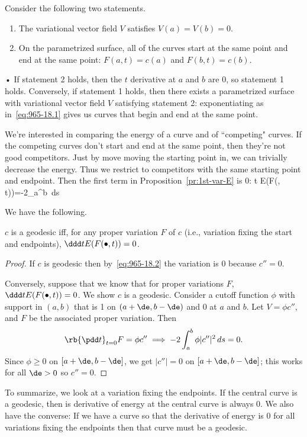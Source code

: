 Consider the following two statements.
\begin{enumerate}
\item
The variational vector field $V$ satisfies $V(a)=V(b)=0$.
\item
On the parametrized surface, all of the curves start at the same point and end at the same point: $F(a,t)=c(a)$ and $F(b,t)=c(b)$.
\end{enumerate}•
If statement 2 holds, then the $t$ derivative at $a$ and $b$ are 0, so statement 1 holds. %
Conversely, if statement 1 holds, then there exists a parametrized surface with variational vector field $V$ satisfying statement 2: exponentiating as in~\eqref{eq:965-18.1} gives us curves that begin and end at the same point.

We're interested in comparing the energy of a curve and of ``competing" curves. If the competing curves don't start and end at the same point, then they're not good competitors. Just by move moving the starting point in, we can trivially decrease the energy. Thus we restrict to competitors with the same starting point and endpoint. Then the first term in Proposition~\ref{pr:1st-var-E} is 0:
\ddd t E(F(\bullet, t))=-2\int_a^b \,ds
\eeq

We have the following.
\begin{pr}
$c$ is a geodesic iff, for any proper variation $F$ of $c$ (i.e., variation fixing the start and endpoints), $\ddd t E(F(\bullet, t))=0$.
\end{pr}
\begin{proof}
If $c$ is geodesic then by~\eqref{eq:965-18.2} the variation is 0 because $c''=0$.

Conversely, suppose that we know that for proper variations $F$, $\ddd t E(F(\bullet, t))=0$. We show $c$ is a geodesic. Consider a cutoff function $\phi$ with support in $(a,b)$ that is 1 on $(a+\de,b-\de)$ and 0 at $a$ and $b$. Let $V=\phi c''$, and $F$ be the associated proper variation. Then
\[
\rb{\pdd t}_{t=0} F=\phi c'' \implies -2 \int_a^b \phi|c''|^2\,ds=0.
\]
Since $\phi\ge 0$ on $[a+\de,b-\de]$, we get $|c''|=0$ on $[a+\de,b-\de]$; this works for all $\de>0$ so $c''=0$.
\end{proof}
To summarize, we look at a variation fixing the endpoints. If the central curve is a geodesic, then is derivative of energy at the central curve is always 0. We also have the converse: If we have a curve so that the derivative of energy is 0 for all variations fixing the endpoints then that curve must be a geodesic. 

